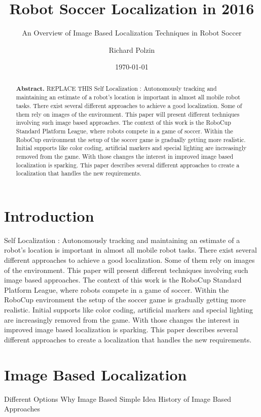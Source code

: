 \documentclass[12pt, a4paper]{scrartcl}
\author{Richard Polzin}
\title{Robot Soccer Localization in 2016}
\subtitle{An Overview of Image Based Localization Techniques in Robot Soccer}
\date{\today}
\begin{document}
  \maketitle

  \begin{abstract}
    \textbf{Abstract.} REPLACE THIS Self Localization : Autonomously tracking and maintaining an estimate of a robot's location is important in almost all mobile robot tasks. There exist several different approaches to achieve a good localization. Some of them rely on images of the environment. This paper will present different techniques involving such image based approaches. The context of this work is the RoboCup Standard Platform League, where robots compete in a game of soccer. Within the RoboCup environment the setup of the soccer game is gradually getting more realistic. Initial supports like color coding, artificial markers and special lighting are increasingly removed from the game. With those changes the interest in improved image based localization is sparking. This paper describes several different approaches to create a localization that handles the new requirements.
  \end{abstract}

  \section{Introduction}
  Self Localization : Autonomously tracking and maintaining an estimate of a robot's location is important in almost all mobile robot tasks. There exist several different approaches to achieve a good localization. Some of them rely on images of the environment. This paper will present different techniques involving such image based approaches. The context of this work is the RoboCup Standard Platform League, where robots compete in a game of soccer. Within the RoboCup environment the setup of the soccer game is gradually getting more realistic. Initial supports like color coding, artificial markers and special lighting are increasingly removed from the game. With those changes the interest in improved image based localization is sparking. This paper describes several different approaches to create a localization that handles the new requirements.

  \section{Image Based Localization}
  Different Options
  Why Image Based
  Simple Idea
  History of Image Based Approaches
\end{document}
